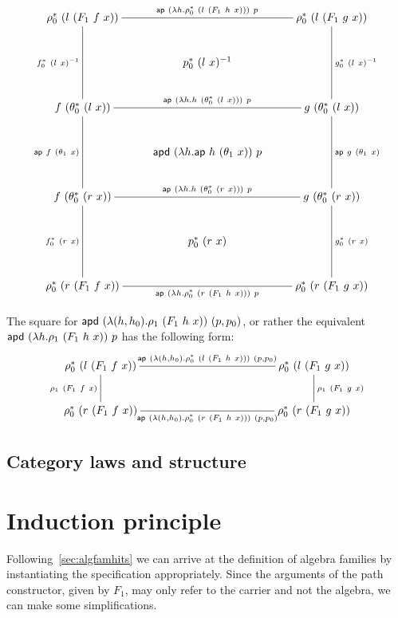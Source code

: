 \documentclass[a4paper,10pt]{report}
\begin{document}
$$
\xymatrix{
\rho_0^*\ (l\ (F_1\ f\ x))
\ar@{-}[dd]_{f_0^*\ (l\ x)^{-1}}
\ar@{-}[rr]^{\ap\ (\lambda h . \rho_0^*\ (l\ (F_1\ h\ x)))\ p}
&&\rho_0^*\ (l\ (F_1\ g\ x))
\ar@{-}[dd]^{g_0^*\ (l\ x)^{-1}}
\\
&p_0^*\ (l\ x)^{-1}&
\\
f\ (\theta_0^*\ (l\ x))
\ar@{-}[dd]_{\ap\ f\ (\theta_1\ x)}
\ar@{-}[rr]^{\ap\ (\lambda h . h\ (\theta_0^*\ (l\ x)))\ p}
&&g\ (\theta_0^*\ (l\ x))
\ar@{-}[dd]^{\ap\ g\ (\theta_1\ x)}
\\
&\apd\ (\lambda h . \ap\ h\ (\theta_1\ x))\ p&
\\
f\ (\theta_0^*\ (r\ x))
\ar@{-}[dd]_{f_0^*\ (r\ x)}
\ar@{-}[rr]^{\ap\ (\lambda h . h\ (\theta_0^*\ (r\ x)))\ p}
&&g\ (\theta_0^*\ (r\ x))
\ar@{-}[dd]^{g_0^*\ (r\ x)}
\\
&p_0^*\ (r\ x)&
\\
\rho_0^*\ (r\ (F_1\ f\ x))
\ar@{-}[rr]_{\ap\ (\lambda h . \rho_0^*\ (r\ (F_1\ h\ x)))\ p}
&&\rho_0^*\ (r\ (F_1\ g\ x))
}
$$

The square for
$\mathsf{apd}\ (\lambda (h,h_0) . \rho_1\ (F_1\ h\ x))\ (p,p_0)$, or rather
the equivalent $\mathsf{apd}\ (\lambda h . \rho_1\ (F_1\ h\ x))\ p$ has the
following form:
$$
\xymatrixcolsep{10pc}
\xymatrix{
  \rho_0^*\ (l\ (F_1\ f\ x))
  \ar@{-}[d]_{\rho_1\ (F_1\ f\ x)}
  \ar@{-}[r]^{\ap\ (\lambda (h,h_0) . \rho_0^*\ (l\ (F_1\ h\ x)))\ (p,p_0)}
  &\rho_0^*\ (l\ (F_1\ g\ x)) 
  \\
  \rho_0^*\ (r\ (F_1\ f\ x))
  &\rho_0^*\ (r\ (F_1\ g\ x)) 
  \ar@{-}[l]^{\ap\ (\lambda (h,h_0) . \rho_0^*\ (r\ (F_1\ h\ x)))\ (p,p_0)}
  \ar@{-}[u]_{\rho_1\ (F_1\ g\ x)}
  \\
}
$$


\subsection{Category laws and structure}


\section{Induction principle}

Following~\cref{sec:algfamhits} we can arrive at the definition of
algebra families by instantiating the specification
appropriately. Since the arguments of the path constructor, given by
$F_1$, may only refer to the carrier and not the algebra, we can make
some simplifications.
\end{document}
